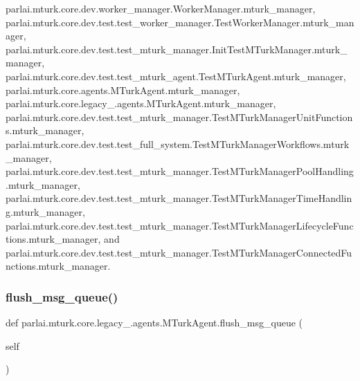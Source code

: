 parlai.\+mturk.\+core.\+dev.\+worker\+\_\+manager.\+Worker\+Manager.\+mturk\+\_\+manager, parlai.\+mturk.\+core.\+dev.\+test.\+test\+\_\+worker\+\_\+manager.\+Test\+Worker\+Manager.\+mturk\+\_\+manager, parlai.\+mturk.\+core.\+dev.\+test.\+test\+\_\+mturk\+\_\+manager.\+Init\+Test\+M\+Turk\+Manager.\+mturk\+\_\+manager, parlai.\+mturk.\+core.\+dev.\+test.\+test\+\_\+mturk\+\_\+agent.\+Test\+M\+Turk\+Agent.\+mturk\+\_\+manager, parlai.\+mturk.\+core.\+agents.\+M\+Turk\+Agent.\+mturk\+\_\+manager, parlai.\+mturk.\+core.\+legacy\+\_.\+agents.\+M\+Turk\+Agent.\+mturk\+\_\+manager, parlai.\+mturk.\+core.\+dev.\+test.\+test\+\_\+mturk\+\_\+manager.\+Test\+M\+Turk\+Manager\+Unit\+Functions.\+mturk\+\_\+manager, parlai.\+mturk.\+core.\+dev.\+test.\+test\+\_\+full\+\_\+system.\+Test\+M\+Turk\+Manager\+Workflows.\+mturk\+\_\+manager, parlai.\+mturk.\+core.\+dev.\+test.\+test\+\_\+mturk\+\_\+manager.\+Test\+M\+Turk\+Manager\+Pool\+Handling.\+mturk\+\_\+manager, parlai.\+mturk.\+core.\+dev.\+test.\+test\+\_\+mturk\+\_\+manager.\+Test\+M\+Turk\+Manager\+Time\+Handling.\+mturk\+\_\+manager, parlai.\+mturk.\+core.\+dev.\+test.\+test\+\_\+mturk\+\_\+manager.\+Test\+M\+Turk\+Manager\+Lifecycle\+Functions.\+mturk\+\_\+manager, and parlai.\+mturk.\+core.\+dev.\+test.\+test\+\_\+mturk\+\_\+manager.\+Test\+M\+Turk\+Manager\+Connected\+Functions.\+mturk\+\_\+manager.

\mbox{\label{classparlai_1_1mturk_1_1core_1_1legacy__2018_1_1agents_1_1MTurkAgent_a209329c54335277c0998a9185cdfc1d7}} 
\subsubsection{\texorpdfstring{flush\+\_\+msg\+\_\+queue()}{flush\_msg\_queue()}}
{\footnotesize\ttfamily def parlai.\+mturk.\+core.\+legacy\+\_.\+agents.\+M\+Turk\+Agent.\+flush\+\_\+msg\+\_\+queue (\begin{DoxyParamCaption}\item[{}]{self }\end{DoxyParamCaption})}

